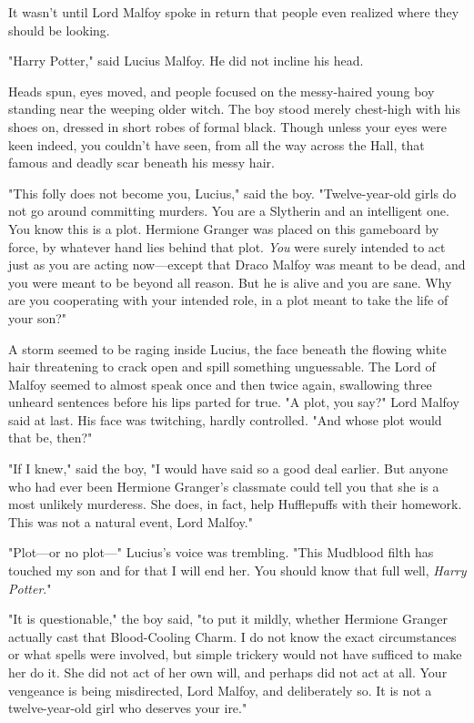 It wasn't until Lord Malfoy spoke in return that people even realized where
they should be looking.

"Harry Potter," said Lucius Malfoy. He did not incline his head.

Heads spun, eyes moved, and people focused on the messy-haired young boy
standing near the weeping older witch. The boy stood merely chest-high with his
shoes on, dressed in short robes of formal black. Though unless your eyes were
keen indeed, you couldn't have seen, from all the way across the Hall, that
famous and deadly scar beneath his messy hair.

"This folly does not become you, Lucius," said the boy. "Twelve-year-old girls
do not go around committing murders. You are a Slytherin and an intelligent
one. You know this is a plot. Hermione Granger was placed on this gameboard by
force, by whatever hand lies behind that plot. \emph{You} were surely intended
to act just as you are acting now---except that Draco Malfoy was meant to be
dead, and you were meant to be beyond all reason. But he is alive and you are
sane. Why are you cooperating with your intended role, in a plot meant to take
the life of your son?"

A storm seemed to be raging inside Lucius, the face beneath the flowing white
hair threatening to crack open and spill something unguessable. The Lord of
Malfoy seemed to almost speak once and then twice again, swallowing three
unheard sentences before his lips parted for true. "A plot, you say?" Lord
Malfoy said at last. His face was twitching, hardly controlled. "And whose plot
would that be, then?"

"If I knew," said the boy, "I would have said so a good deal earlier. But
anyone who had ever been Hermione Granger's classmate could tell you that she
is a most unlikely murderess. She does, in fact, help Hufflepuffs with their
homework. This was not a natural event, Lord Malfoy."

"Plot---or no plot\mbox{---}" Lucius's voice was trembling. "This Mudblood filth has
touched my son and for that I will end her. You should know that full well,
\emph{Harry Potter}."

"It is questionable," the boy said, "to put it mildly, whether Hermione Granger
actually cast that Blood-Cooling Charm. I do not know the exact circumstances
or what spells were involved, but simple trickery would not have sufficed to
make her do it. She did not act of her own will, and perhaps did not act at
all. Your vengeance is being misdirected, Lord Malfoy, and deliberately so. It
is not a twelve-year-old girl who deserves your ire."

